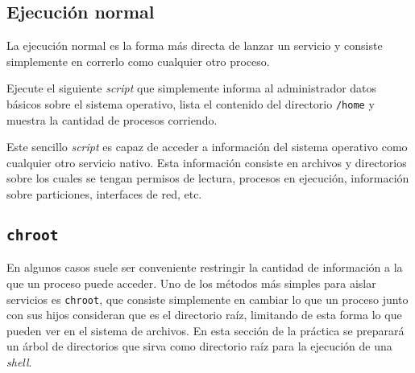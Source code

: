 \subsection{Ejecución normal}
La ejecución normal es la forma más directa de lanzar un servicio y
consiste simplemente en correrlo como cualquier otro proceso.

\begin{questions}
 
  \question Ejecute el siguiente
  \textit{script} que simplemente informa al administrador datos básicos
  sobre el sistema operativo, lista el contenido del directorio
  \texttt{/home} y muestra la cantidad de procesos corriendo.
  
  

  Este sencillo \textit{script} es capaz de acceder a información del
  sistema operativo como cualquier otro servicio nativo. Esta información
  consiste en archivos y directorios sobre los cuales se tengan permisos de
  lectura, procesos en ejecución, información sobre particiones, interfaces
  de red, etc. 
  
\end{questions}

\subsection{\texttt{chroot}}
En algunos casos suele ser conveniente restringir la cantidad de
información a la que un proceso puede acceder. Uno de los métodos más
simples para aislar servicios es \texttt{chroot}, que consiste simplemente
en cambiar lo que un proceso junto con sus hijos consideran que es el
directorio raíz, limitando de esta forma lo que pueden ver en el sistema de
archivos. En esta sección de la práctica se preparará un árbol de
directorios que sirva como directorio raíz para la ejecución de una
\textit{shell}.

